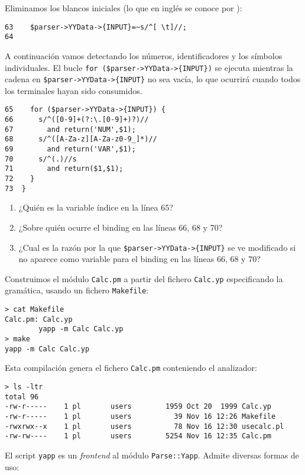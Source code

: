 Eliminamos los blancos iniciales (lo que en inglés se conoce por
):
\begin{verbatim}
63    $parser->YYData->{INPUT}=~s/^[ \t]//;
64  
\end{verbatim}
A continuación vamos detectando los números, identificadores
y los símbolos individuales. El bucle \verb|for ($parser->YYData->{INPUT})|
se ejecuta mientras la cadena
en \verb|$parser->YYData->{INPUT}| no sea vacía, lo que ocurrirá cuando todos 
los terminales hayan sido consumidos.

\begin{verbatim}
65    for ($parser->YYData->{INPUT}) {
66      s/^([0-9]+(?:\.[0-9]+)?)//
67        and return('NUM',$1);
68      s/^([A-Za-z][A-Za-z0-9_]*)//
69        and return('VAR',$1);
70      s/^(.)//s
71        and return($1,$1);
72    }
73  }
\end{verbatim}

\begin{exercise}
\begin{enumerate}
\item ¿Quién es la variable índice en la línea 65? 
\item ¿Sobre quién ocurre el binding en las líneas 66, 68 y 70? 
\item ¿Cual es la razón por la que \verb|$parser->YYData->{INPUT}| se 
ve modificado si no aparece como variable para el binding en las líneas 66, 68 y 70?
\end{enumerate}
\end{exercise}

Construimos el módulo \verb|Calc.pm| a partir del fichero \verb|Calc.yp|
especificando la gramática, usando un fichero \verb|Makefile|:
\begin{verbatim}
> cat Makefile
Calc.pm: Calc.yp
        yapp -m Calc Calc.yp
> make
yapp -m Calc Calc.yp
\end{verbatim}
Esta compilación genera el fichero \verb|Calc.pm| conteniendo el
analizador:
\begin{verbatim}
> ls -ltr
total 96
-rw-r-----    1 pl       users        1959 Oct 20  1999 Calc.yp
-rw-r-----    1 pl       users          39 Nov 16 12:26 Makefile
-rwxrwx--x    1 pl       users          78 Nov 16 12:30 usecalc.pl
-rw-rw----    1 pl       users        5254 Nov 16 12:35 Calc.pm
\end{verbatim}

El script \verb|yapp| es un \emph{frontend} al módulo \verb|Parse::Yapp|.
Admite diversas formas de uso:

